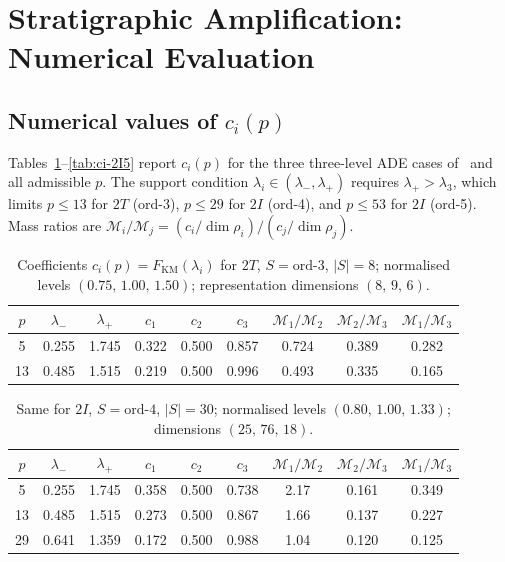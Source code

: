 \section{Stratigraphic Amplification: Numerical Evaluation}
  \label{sec:amplification}

  \subsection{Numerical values of $c_i(p)$}
    \label{sec:amp:ci}

    Tables~\ref{tab:ci-2T}--\ref{tab:ci-2I5} report $c_i(p)$ for the three
    three-level ADE cases of~\cite{Beau2026a4} and all admissible $p$.
    The support condition $\lambda_i \in (\lambda_-, \lambda_+)$ requires
    $\lambda_+ > \lambda_3$, which limits $p \leq 13$ for $2T$ (ord-3),
    $p \leq 29$ for $2I$ (ord-4), and $p \leq 53$ for $2I$ (ord-5).
    Mass ratios are $\mathcal{M}_i/\mathcal{M}_j = (c_i/\dim\rho_i)/(c_j/\dim\rho_j)$.

    \begin{table}[h]
      \centering
      \caption{Coefficients $c_i(p) = F_{\mathrm{KM}}(\lambda_i)$ for
        $2T$, $S=\mathrm{ord}\text{-}3$, $|S|=8$;
        normalised levels $(0.75,\,1.00,\,1.50)$;
        representation dimensions $(8,\,9,\,6)$.}
      \label{tab:ci-2T}
      \begin{tabular}{@{}ccccccccc@{}}
        \toprule
        $p$ & $\lambda_-$ & $\lambda_+$ & $c_1$ & $c_2$ & $c_3$
        & $\mathcal{M}_1/\mathcal{M}_2$
        & $\mathcal{M}_2/\mathcal{M}_3$
        & $\mathcal{M}_1/\mathcal{M}_3$ \\
        \midrule
        5 & 0.255 & 1.745 & 0.322 & 0.500 & 0.857 & 0.724 & 0.389 & 0.282 \\
        13 & 0.485 & 1.515 & 0.219 & 0.500 & 0.996 & 0.493 & 0.335 & 0.165 \\
        \bottomrule
      \end{tabular}
    \end{table}

    \begin{table}[h]
      \centering
      \caption{Same for $2I$, $S=\mathrm{ord}\text{-}4$, $|S|=30$;
      normalised levels $(0.80,\,1.00,\,1.33)$;
      dimensions $(25,\,76,\,18)$.}
      \label{tab:ci-2I4}
      \begin{tabular}{@{}ccccccccc@{}}
        \toprule
        $p$ & $\lambda_-$ & $\lambda_+$ & $c_1$ & $c_2$ & $c_3$
        & $\mathcal{M}_1/\mathcal{M}_2$
        & $\mathcal{M}_2/\mathcal{M}_3$
        & $\mathcal{M}_1/\mathcal{M}_3$ \\
        \midrule
        5 & 0.255 & 1.745 & 0.358 & 0.500 & 0.738 & 2.17  & 0.161 & 0.349 \\
        13 & 0.485 & 1.515 & 0.273 & 0.500 & 0.867 & 1.66  & 0.137 & 0.227 \\
        29 & 0.641 & 1.359 & 0.172 & 0.500 & 0.988 & 1.04  & 0.120 & 0.125 \\
        \bottomrule
      \end{tabular}
    \end{table}

